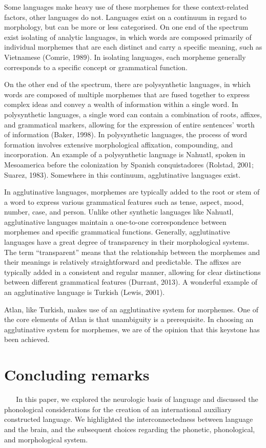 Some languages make heavy use of these morphemes for these context-related factors, other languages do not. Languages exist on a continuum in regard to morphology, but can be more or less categorised. On one end of the spectrum exist isolating of analytic languages, in which words are composed primarily of individual morphemes that are each distinct and carry a specific meaning, such as Vietnamese (Comrie, 1989). In isolating languages, each morpheme generally corresponds to a specific concept or grammatical function. 

On the other end of the spectrum, there are polysynthetic languages, in which words are composed of multiple morphemes that are fused together to express complex ideas and convey a wealth of information within a single word. In polysynthetic languages, a single word can contain a combination of roots, affixes, and grammatical markers, allowing for the expression of entire sentences' worth of information (Baker, 1998). In polysynthetic languages, the process of word formation involves extensive morphological affixation, compounding, and incorporation. An example of a polysynthetic language is Nahuatl, spoken in Mesoamerica before the colonization by Spanish conquistadores (Rolstad, 2001; Suarez, 1983). Somewhere in this continuum, agglutinative languages exist. 

In agglutinative languages, morphemes are typically added to the root or stem of a word to express various grammatical features such as tense, aspect, mood, number, case, and person. Unlike other synthetic languages like Nahuatl, agglutinative languages maintain a one-to-one correspondence between morphemes and specific grammatical functions. Generally, agglutinative languages have a great degree of transparency in their morphological systems. The term “transparent” means that the relationship between the morphemes and their meanings is relatively straightforward and predictable. The affixes are typically added in a consistent and regular manner, allowing for clear distinctions between different grammatical features (Durrant, 2013). A wonderful example of an agglutinative language is Turkish (Lewis, 2001). 

Atlan, like Turkish, makes use of an agglutinative system for morphemes. One of the core elements of Atlan is that unambiguity is a prerequisite. In choosing an agglutinative system for morphemes, we are of the opinion that this keystone has been achieved.  
  
  
\section{Concluding remarks} 
  
\noindent In this paper, we explored the neurologic basis of language and discussed the phonological considerations for the creation of an international auxiliary constructed language. We highlighted the interconnectedness between language and the brain, and the subsequent choices regarding the phonetic, phonological, and morphological system.

